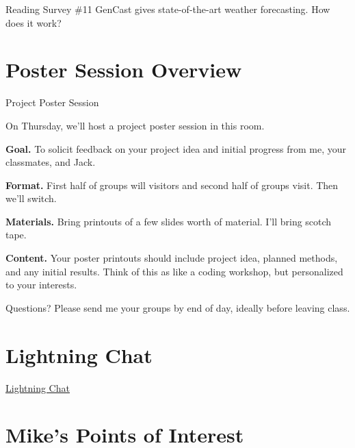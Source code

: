 \documentclass[10pt]{beamer}
\begin{document}
\begin{frame}{Reading Survey \#11}
GenCast gives state-of-the-art weather forecasting. How does it work?
\end{frame}


\section{Poster Session Overview}

\begin{frame}{Project Poster Session}

On Thursday, we'll host a project \alert{poster session} in this room.

\vfill \pause 

\colorbox{green!30}{\textbf{Goal.}} To solicit feedback on your project idea and initial progress from me, your classmates, and Jack.  
	
\vfill \pause 

\colorbox{blue!30}{\textbf{Format.}} First half of groups will  visitors and second half of groups visit.  Then we'll switch.
	
\vfill \pause 

\colorbox{red!30}{\textbf{Materials.}} Bring printouts of a few slides worth of material.   I'll bring scotch tape.


\vfill \pause 


\colorbox{purple!30}{\textbf{Content.}} Your poster printouts should include project idea, planned methods, and any initial results.   Think of this as like a coding workshop, but personalized to your interests.

\vfill \pause 

Questions?  \pause  Please send me your groups by end of day, ideally before leaving class.
\end{frame}


\section{Lightning Chat}

\begin{frame}[standout]
\href{https://docs.google.com/presentation/d/1z5YcRd1y6GK21Wt7lphUn3QFdEBR6A2UMtdK7fihe7s/edit?usp=sharing}{\underline{Lightning Chat}} 
\end{frame}



\section{Mike's Points of Interest}
 
\end{document}
